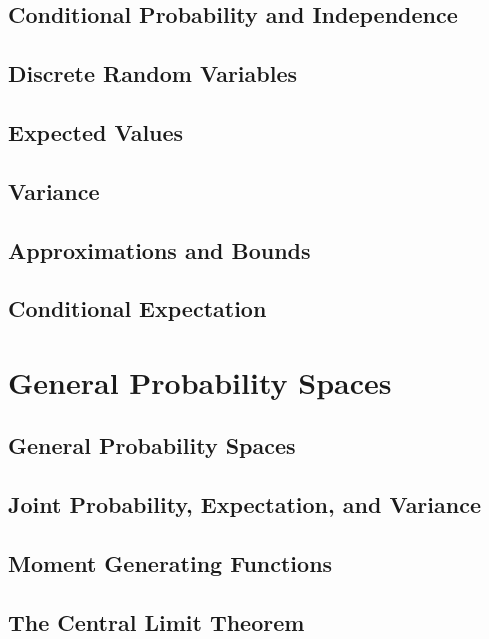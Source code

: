 \documentclass[10pt]{article}
\begin{document}
\newpage
\subsection{Conditional Probability and Independence}


\newpage
\subsection{Discrete Random Variables}


\newpage
\subsection{Expected Values}


\newpage
\subsection{Variance}


\newpage
\subsection{Approximations and Bounds}


\newpage
\subsection{Conditional Expectation}


\newpage
\section{General Probability Spaces}
\subsection{General Probability Spaces}


\newpage
\subsection{Joint Probability, Expectation, and Variance}


\newpage
\subsection{Moment Generating Functions}


\newpage
\subsection{The Central Limit Theorem}

\end{document}
